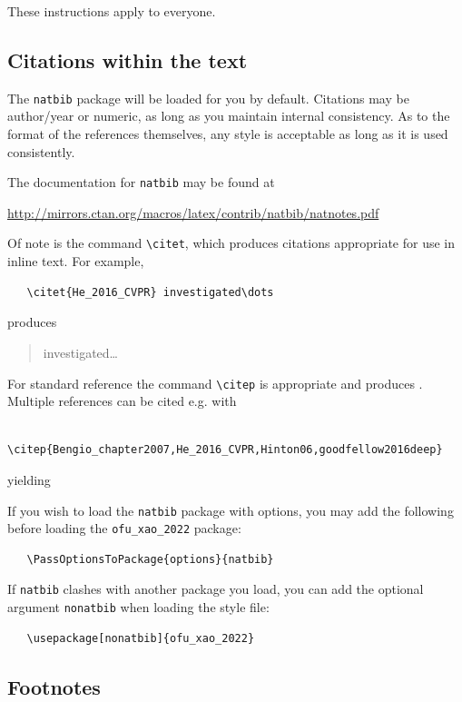 \documentclass[a4paper]{article}
\begin{document}
These instructions apply to everyone.


\subsection{Citations within the text}


The \verb+natbib+ package will be loaded for you by default.  Citations may be
author/year or numeric, as long as you maintain internal consistency.  As to the
format of the references themselves, any style is acceptable as long as it is
used consistently.


The documentation for \verb+natbib+ may be found at
\begin{center}
  \url{http://mirrors.ctan.org/macros/latex/contrib/natbib/natnotes.pdf}
\end{center}
Of note is the command \verb+\citet+, which produces citations appropriate for
use in inline text.  For example,
\begin{verbatim}
   \citet{He_2016_CVPR} investigated\dots
\end{verbatim}
produces
\begin{quote}
  \citet{He_2016_CVPR} investigated\dots
\end{quote}

For standard reference the command \verb+\citep+ is appropriate and produces \citep{He_2016_CVPR}. Multiple references can be cited e.g. with
\begin{verbatim}
    \citep{Bengio_chapter2007,He_2016_CVPR,Hinton06,goodfellow2016deep}
\end{verbatim}
yielding 
\begin{quote}
    \citep{Bengio_chapter2007,He_2016_CVPR,Hinton06,goodfellow2016deep}
\end{quote}

If you wish to load the \verb+natbib+ package with options, you may add the
following before loading the \verb+ofu_xao_2022+ package:
\begin{verbatim}
   \PassOptionsToPackage{options}{natbib}
\end{verbatim}


If \verb+natbib+ clashes with another package you load, you can add the optional
argument \verb+nonatbib+ when loading the style file:
\begin{verbatim}
   \usepackage[nonatbib]{ofu_xao_2022}
\end{verbatim}


\subsection{Footnotes}
\end{document}
